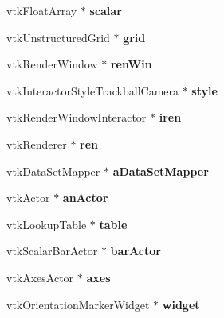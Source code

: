 \begin{CompactItemize}
\item 
\hypertarget{classGeometry_49e66de69aa22b88759e903e1ae06c9b}{
vtkFloatArray $\ast$ \textbf{scalar}}
\label{classGeometry_49e66de69aa22b88759e903e1ae06c9b}

\item 
\hypertarget{classGeometry_ebabda9f0c07ecb986195857913b4ee8}{
vtkUnstructuredGrid $\ast$ \textbf{grid}}
\label{classGeometry_ebabda9f0c07ecb986195857913b4ee8}

\item 
\hypertarget{classGeometry_22b4feeba28c4834bc9ac42e838cb7bb}{
vtkRenderWindow $\ast$ \textbf{renWin}}
\label{classGeometry_22b4feeba28c4834bc9ac42e838cb7bb}

\item 
\hypertarget{classGeometry_994d1c4d7c8ce0622fcf7a96b5d234af}{
vtkInteractorStyleTrackballCamera $\ast$ \textbf{style}}
\label{classGeometry_994d1c4d7c8ce0622fcf7a96b5d234af}

\item 
\hypertarget{classGeometry_6563f9a823d1dcee59554a5d093d6c73}{
vtkRenderWindowInteractor $\ast$ \textbf{iren}}
\label{classGeometry_6563f9a823d1dcee59554a5d093d6c73}

\item 
\hypertarget{classGeometry_0893a3a686dc14327816c9648efe8662}{
vtkRenderer $\ast$ \textbf{ren}}
\label{classGeometry_0893a3a686dc14327816c9648efe8662}

\item 
\hypertarget{classGeometry_f314d57676056969da57788a60954926}{
vtkDataSetMapper $\ast$ \textbf{aDataSetMapper}}
\label{classGeometry_f314d57676056969da57788a60954926}

\item 
\hypertarget{classGeometry_86a213e57fee0c578d220d8015c2891b}{
vtkActor $\ast$ \textbf{anActor}}
\label{classGeometry_86a213e57fee0c578d220d8015c2891b}

\item 
\hypertarget{classGeometry_aabe40cbb12206d80e4376367568934b}{
vtkLookupTable $\ast$ \textbf{table}}
\label{classGeometry_aabe40cbb12206d80e4376367568934b}

\item 
\hypertarget{classGeometry_f87eb1e4ab0922d0475afc67061ae30a}{
vtkScalarBarActor $\ast$ \textbf{barActor}}
\label{classGeometry_f87eb1e4ab0922d0475afc67061ae30a}

\item 
\hypertarget{classGeometry_17c7a286dc0a428e8a32db4c8d54bb5e}{
vtkAxesActor $\ast$ \textbf{axes}}
\label{classGeometry_17c7a286dc0a428e8a32db4c8d54bb5e}

\item 
\hypertarget{classGeometry_d611799bc0eb8825c963bd6d56181d8c}{
vtkOrientationMarkerWidget $\ast$ \textbf{widget}}
\label{classGeometry_d611799bc0eb8825c963bd6d56181d8c}

\end{CompactItemize}


